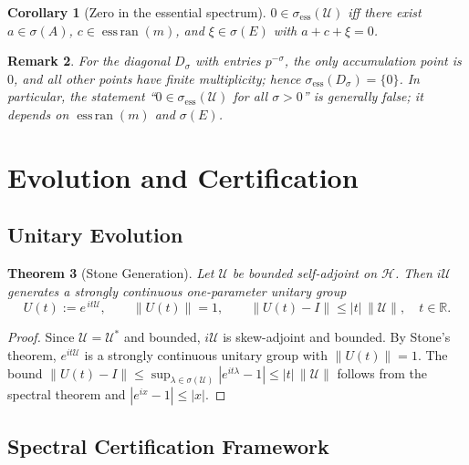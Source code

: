 \documentclass[10pt]{article}
\newtheorem{theorem}{Theorem}
\newtheorem{corollary}[theorem]{Corollary}
\newtheorem{remark}[theorem]{Remark}
\DeclareMathOperator{\EssRan}{ess\,ran}
\begin{document}
\begin{corollary}[Zero in the essential spectrum]\label{cor:zero-in-ess}
$0\in\sigma_{\mathrm{ess}}(\mathcal U)$ iff there exist $a\in\sigma(A)$, $c\in\EssRan(m)$, and $\xi\in\sigma(E)$ with $a+c+\xi=0$.
\end{corollary}

\begin{remark}
For the diagonal $D_\sigma$ with entries $p^{-\sigma}$, the only accumulation point is $0$, and all other points have finite multiplicity; hence $\sigma_{\mathrm{ess}}(D_\sigma)=\{0\}$.
In particular, the statement “$0\in\sigma_{\mathrm{ess}}(\mathcal U)$ for all $\sigma>0$” is generally false; it depends on $\EssRan(m)$ and $\sigma(E)$.
\end{remark}


\section{Evolution and Certification}

\subsection{Unitary Evolution}

\begin{theorem}[Stone Generation]
Let $\mathcal U$ be bounded self-adjoint on $\mathcal H$. Then $i\mathcal U$ generates a strongly continuous one-parameter unitary group
\[
U(t):=e^{\,it\mathcal U},\qquad \|U(t)\|=1,\qquad \|U(t)-I\|\le |t|\,\|\mathcal U\|,\quad t\in\mathbb R.
\]
\end{theorem}

\begin{proof}
Since $\mathcal U=\mathcal U^\ast$ and bounded, $i\mathcal U$ is skew-adjoint and bounded. By Stone's theorem, $e^{it\mathcal U}$ is a strongly continuous unitary group with $\|U(t)\|=1$. The bound $\|U(t)-I\|\le \sup_{\lambda\in\sigma(\mathcal U)}|e^{it\lambda}-1|\le |t|\,\|\mathcal U\|$ follows from the spectral theorem and $|e^{ix}-1|\le |x|$.
\end{proof}

\subsection{Spectral Certification Framework}
\end{document}
